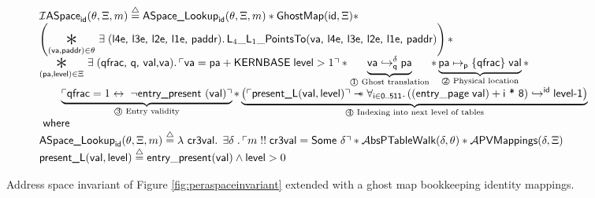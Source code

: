 \begin{figure*}
\footnotesize
\[
\begin{array}{l}
  \mathcal{I}\textsf{ASpace}_{\textsf{id}}(\ptablestore,\Xi,m)\stackrel{\triangle}{=} \textsf{ASpace\_Lookup}_{\textsf{id}}(\ptablestore,\Xi,m) \ast \mathsf{GhostMap}(\mathsf{id},\Xi)\ast\\
  \left(\bigast{(\vaddr, \textsf{paddr})\in \ptablestore}{\exists\;(\textsf{l4e, l3e, l2e, l1e, paddr})\ldotp \textsf{L}_{4}\_\textsf{L}_{1}\_\textsf{PointsTo}(\vaddr\textsf{, l4e, l3e, l2e, l1e, paddr})}\right)\ast \\
  \bigast{(\paddr,\mathsf{level}) \in \Xi}{\exists\; (\textsf{qfrac, q, val,}\vaddr) \ldotp \ulcorner \vaddr = \paddr + \textsf{KERNBASE} \; \textsf{level} > 1\urcorner \ast  \underbrace{\fracghostmaptoken{\delta}{\vaddr}{\paddr}{\qfrac} }_\text{\textcircled{1} Ghost translation} \ast \underbrace{\paddr \mapsto_{\mathsf{p}}\{\textsf{qfrac}\}\; \vale}_\text{\textcircled{2} Physical location}} \ast\\
   \qquad\underbrace{ \ulcorner \textsf{qfrac} = 1 \leftrightarrow \; \lnot\textsf{entry\_present }(\vale) \urcorner}_\text{\textcircled{3} Entry validity}\ast 
    \underbrace{\left(\ulcorner\textsf{present\_L}(\vale,\mathsf{level})\urcorner \wand \forall_{\textsf{i}\in\textsf{0..511}} \ldotp \ghostmaptoken{\textsf{id}}{((\mathsf{entry\_page}\;\vale) + \textsf{i * 8})}{\textsf{level-1}}\right)}_{\text{\textcircled{4} Indexing into next level of tables}} \\
  \textsf{ where } \\
   \textsf{ASpace\_Lookup}_{\textsf{id}}(\ptablestore,\Xi,m) \stackrel{\triangle}{=} \lambda\textsf{ cr3val} \ldotp \; \exists \gammaPred \; \ldotp \ulcorner m \; !!\; \textsf{cr3val} = \textsf{Some } \gammaPred \urcorner \ast
   \ptableabswalk{\delta,\ptablestore} \ast \pvmapping{\delta,\Xi}\\
  \textsf{present\_L}(\vale,\mathsf{level})\stackrel{\triangle}{=} \mathsf{entry\_present}(\vale)\land \mathsf{level} > 0
  
\end{array}
\]
\vspace{-1em}
\caption{Address space invariant of Figure \ref{fig:peraspaceinvariant} extended with a ghost map bookkeeping identity mappings. }
  \label{fig:peraspaceinvariant_with_p2v_extensionC}
\vspace{-1em}
\end{figure*}

